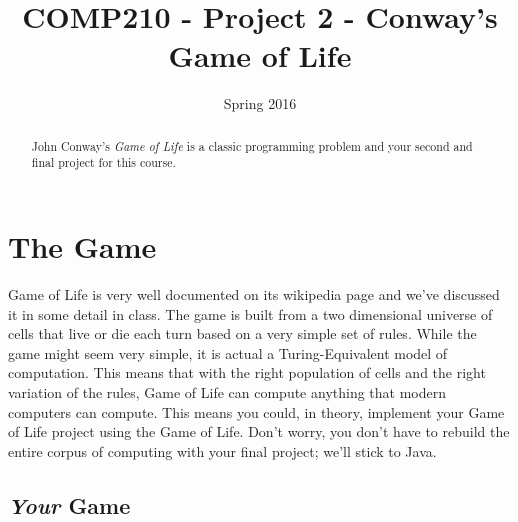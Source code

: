 \documentclass[]{tufte-handout}
\title{COMP210 - Project 2 - Conway's Game of Life}
\author{}
\date{Spring 2016}
\begin{document}
\maketitle


\begin{abstract}
John Conway's \textit{Game of Life} is a classic programming problem and your second and final project for this course.
\end{abstract}

\section{The Game}

Game of Life is very well documented on its wikipedia page and we've discussed it in some detail in class.  The game is built from a two dimensional universe of cells that live or die each turn based on a very simple set of rules.  While the game might seem very simple, it is actual a Turing-Equivalent model of computation.  This means that with the right population of cells and the right variation of the rules, Game of Life can compute anything that modern computers can compute.  This means you could, in theory, implement your Game of Life project using the Game of Life. Don't worry, you don't have to rebuild the entire corpus of computing with your final project; we'll stick to Java.  

\subsection{\textit{Your} Game}
\end{document}
